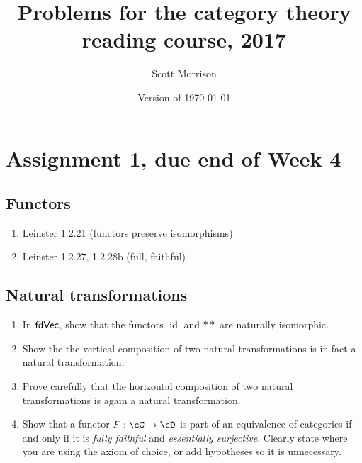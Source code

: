 \documentclass[12pt]{amsart}
\begin{document}
\title{Problems for the category theory reading course, 2017}
\author{Scott Morrison}
  \address[Scott Morrison]{
  	Mathematical Sciences Institute,
  	Australian National University
  }
\date{Version of \today}

\maketitle

\section{Assignment 1, due end of Week 4}

\subsection{Functors}
\begin{enumerate}
\item Leinster 1.2.21 (functors preserve isomorphisms)
\item Leinster 1.2.27, 1.2.28b (full, faithful)
\end{enumerate}

\subsection{Natural transformations}
\begin{enumerate}
\item In $\sf{fdVec}$, show that the functors $\operatorname{id}$ and $**$ are naturally isomorphic. 
\item Show the the vertical composition of two natural transformations is in fact a natural transformation.
\item Prove carefully that the horizontal composition of two natural transformations is again a natural transformation.
\item Show that a functor $F : \cC \to \cD$ is part of an equivalence of categories if and only if it is \emph{fully faithful} and \emph{essentially surjective}. Clearly state where you are using the axiom of choice, or add hypotheses so it is unnecessary.
\end{enumerate}
\end{document}
